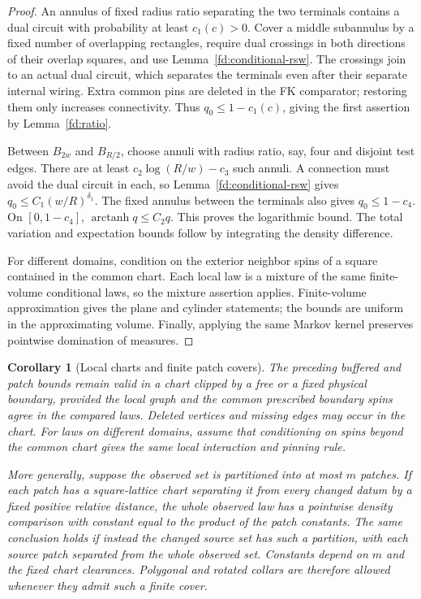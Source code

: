 \documentclass[11pt]{article}
\newtheorem{corollary}[theorem]{Corollary}
\theoremstyle{definition}
\theoremstyle{remark}
\numberwithin{equation}{section}
\begin{document}
\begin{proof}
An annulus of fixed radius ratio separating the two terminals contains a
dual circuit with probability at least \(c_1(c)>0\).  Cover a middle
subannulus by a fixed number of overlapping rectangles, require dual
crossings in both directions of their overlap squares, and use
Lemma~\ref{fd:conditional-rsw}.  The crossings join to an actual dual
circuit, which separates the terminals even after their separate internal
wiring.  Extra common pins are deleted in the FK comparator; restoring
them only increases connectivity.  Thus \(q_0\le1-c_1(c)\), giving the
first assertion by Lemma~\ref{fd:ratio}.

Between \(B_{2w}\) and \(B_{R/2}\), choose annuli with radius ratio, say,
four and disjoint test edges.  There are at least
\(c_2\log(R/w)-c_3\) such annuli.  A connection must avoid the dual
circuit in each, so Lemma~\ref{fd:conditional-rsw} gives
\(q_0\le C_1(w/R)^{\delta_1}\).
The fixed annulus between the terminals also gives \(q_0\le1-c_4\).
On \([0,1-c_4]\), \(\operatorname{arctanh}q\le C_2q\).
This proves the logarithmic bound.  The total variation and expectation
bounds follow by integrating the density difference.

For different domains, condition on the exterior neighbor spins of a
square contained in the common chart.  Each local law is a mixture of
the same finite-volume conditional laws, so the mixture assertion applies.
Finite-volume approximation gives the plane and cylinder statements;
the bounds are uniform in the approximating volume.  Finally, applying
the same Markov kernel preserves pointwise domination of measures.
\end{proof}

\begin{corollary}[Local charts and finite patch covers]
\label{fd:finite-cover}
The preceding buffered and patch bounds remain valid in a chart clipped
by a free or a fixed physical boundary, provided the local graph and
the common prescribed boundary spins agree in the compared laws.
Deleted vertices and missing edges may occur in the chart. For laws on
different domains, assume that conditioning on spins beyond the common
chart gives the same local interaction and pinning rule.

More generally, suppose the observed set is partitioned into at most
$m$ patches. If each patch has a square-lattice chart separating it
from every changed datum by a fixed positive relative distance, the
whole observed law has a pointwise density comparison with constant
equal to the product of the patch constants. The same conclusion holds
if instead the changed source set has such a partition, with each
source patch separated from the whole observed set. Constants depend
on $m$ and the fixed chart clearances. Polygonal and rotated collars
are therefore allowed whenever they admit such a finite cover.
\end{corollary}
\end{document}
